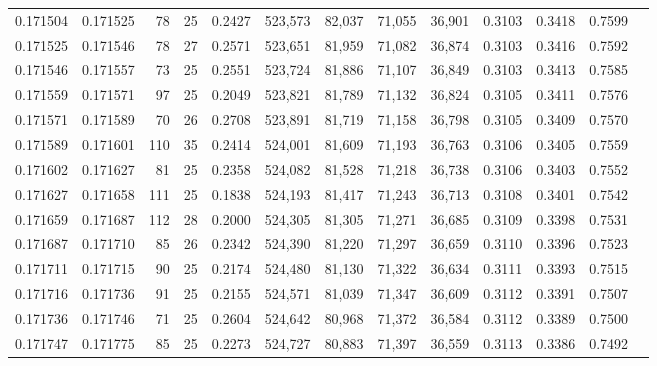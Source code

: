 \begin{tabular}{rrrrrrrrrrrrr}
0.171504 & 0.171525 &  78 &  25 &                                     0.2427 & 523,573 &  82,037 &  71,055 &  36,901 & 0.3103 & 0.3418 & 0.7599 \\
0.171525 & 0.171546 &  78 &  27 &                                     0.2571 & 523,651 &  81,959 &  71,082 &  36,874 & 0.3103 & 0.3416 & 0.7592 \\
0.171546 & 0.171557 &  73 &  25 &                                     0.2551 & 523,724 &  81,886 &  71,107 &  36,849 & 0.3103 & 0.3413 & 0.7585 \\
0.171559 & 0.171571 &  97 &  25 &                                     0.2049 & 523,821 &  81,789 &  71,132 &  36,824 & 0.3105 & 0.3411 & 0.7576 \\
0.171571 & 0.171589 &  70 &  26 &                                     0.2708 & 523,891 &  81,719 &  71,158 &  36,798 & 0.3105 & 0.3409 & 0.7570 \\
0.171589 & 0.171601 & 110 &  35 &                                     0.2414 & 524,001 &  81,609 &  71,193 &  36,763 & 0.3106 & 0.3405 & 0.7559 \\
0.171602 & 0.171627 &  81 &  25 &                                     0.2358 & 524,082 &  81,528 &  71,218 &  36,738 & 0.3106 & 0.3403 & 0.7552 \\
0.171627 & 0.171658 & 111 &  25 &                                     0.1838 & 524,193 &  81,417 &  71,243 &  36,713 & 0.3108 & 0.3401 & 0.7542 \\
0.171659 & 0.171687 & 112 &  28 &                                     0.2000 & 524,305 &  81,305 &  71,271 &  36,685 & 0.3109 & 0.3398 & 0.7531 \\
0.171687 & 0.171710 &  85 &  26 &                                     0.2342 & 524,390 &  81,220 &  71,297 &  36,659 & 0.3110 & 0.3396 & 0.7523 \\
0.171711 & 0.171715 &  90 &  25 &                                     0.2174 & 524,480 &  81,130 &  71,322 &  36,634 & 0.3111 & 0.3393 & 0.7515 \\
0.171716 & 0.171736 &  91 &  25 &                                     0.2155 & 524,571 &  81,039 &  71,347 &  36,609 & 0.3112 & 0.3391 & 0.7507 \\
0.171736 & 0.171746 &  71 &  25 &                                     0.2604 & 524,642 &  80,968 &  71,372 &  36,584 & 0.3112 & 0.3389 & 0.7500 \\
0.171747 & 0.171775 &  85 &  25 &                                     0.2273 & 524,727 &  80,883 &  71,397 &  36,559 & 0.3113 & 0.3386 & 0.7492 \\

\end{tabular}
